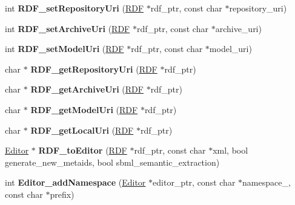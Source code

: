 \begin{DoxyCompactItemize}
int {\bfseries R\+D\+F\+\_\+set\+Repository\+Uri} (\hyperlink{classomexmeta_1_1RDF}{R\+DF} $\ast$rdf\+\_\+ptr, const char $\ast$repository\+\_\+uri)
\item 
\mbox{\label{namespaceomexmeta_a9c1dcbcf82b851e5998f24b10a08566a}} 
int {\bfseries R\+D\+F\+\_\+set\+Archive\+Uri} (\hyperlink{classomexmeta_1_1RDF}{R\+DF} $\ast$rdf\+\_\+ptr, const char $\ast$archive\+\_\+uri)
\item 
\mbox{\label{namespaceomexmeta_ae4867650bb4affd1a0ece773b85f125b}} 
int {\bfseries R\+D\+F\+\_\+set\+Model\+Uri} (\hyperlink{classomexmeta_1_1RDF}{R\+DF} $\ast$rdf\+\_\+ptr, const char $\ast$model\+\_\+uri)
\item 
\mbox{\label{namespaceomexmeta_ad459c70147e6e1f0264b1c24b516fd0f}} 
char $\ast$ {\bfseries R\+D\+F\+\_\+get\+Repository\+Uri} (\hyperlink{classomexmeta_1_1RDF}{R\+DF} $\ast$rdf\+\_\+ptr)
\item 
\mbox{\label{namespaceomexmeta_ae273ee890977b35fa8b4fdea9ccd1297}} 
char $\ast$ {\bfseries R\+D\+F\+\_\+get\+Archive\+Uri} (\hyperlink{classomexmeta_1_1RDF}{R\+DF} $\ast$rdf\+\_\+ptr)
\item 
\mbox{\label{namespaceomexmeta_ad92ca3d3ae83ad7d46027a6a399d21e9}} 
char $\ast$ {\bfseries R\+D\+F\+\_\+get\+Model\+Uri} (\hyperlink{classomexmeta_1_1RDF}{R\+DF} $\ast$rdf\+\_\+ptr)
\item 
\mbox{\label{namespaceomexmeta_adc76b37982d7d44b3e48f3686064a966}} 
char $\ast$ {\bfseries R\+D\+F\+\_\+get\+Local\+Uri} (\hyperlink{classomexmeta_1_1RDF}{R\+DF} $\ast$rdf\+\_\+ptr)
\item 
\mbox{\label{namespaceomexmeta_a32e6dbf136ae77858262cab19093a6a1}} 
\hyperlink{classomexmeta_1_1Editor}{Editor} $\ast$ {\bfseries R\+D\+F\+\_\+to\+Editor} (\hyperlink{classomexmeta_1_1RDF}{R\+DF} $\ast$rdf\+\_\+ptr, const char $\ast$xml, bool generate\+\_\+new\+\_\+metaids, bool sbml\+\_\+semantic\+\_\+extraction)
\item 
\mbox{\label{namespaceomexmeta_a3c05babeced84a464bcf29fb618230b4}} 
int {\bfseries Editor\+\_\+add\+Namespace} (\hyperlink{classomexmeta_1_1Editor}{Editor} $\ast$editor\+\_\+ptr, const char $\ast$namespace\+\_\+, const char $\ast$prefix)

\end{DoxyCompactItemize}
